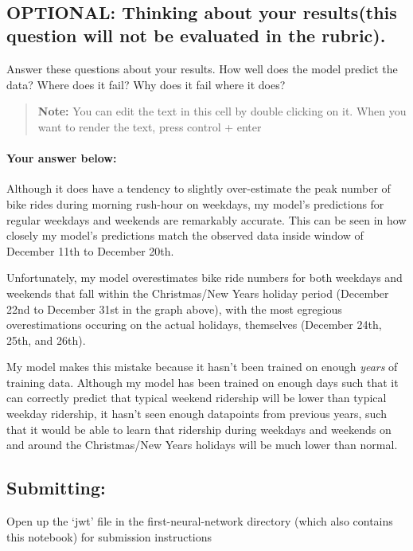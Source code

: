 \documentclass[11pt]{article}
\begin{document}
    \begin{center}
    \end{center}
    { \hspace*{\fill} \\}
    
    \hypertarget{optional-thinking-about-your-resultsthis-question-will-not-be-evaluated-in-the-rubric.}{%
\subsection{OPTIONAL: Thinking about your results(this question will not
be evaluated in the
rubric).}\label{optional-thinking-about-your-resultsthis-question-will-not-be-evaluated-in-the-rubric.}}

Answer these questions about your results. How well does the model
predict the data? Where does it fail? Why does it fail where it does?

\begin{quote}
\textbf{Note:} You can edit the text in this cell by double clicking on
it. When you want to render the text, press control + enter
\end{quote}

\hypertarget{your-answer-below}{%
\paragraph{Your answer below:}\label{your-answer-below}}

Although it does have a tendency to slightly over-estimate the peak
number of bike rides during morning rush-hour on weekdays, my model's
predictions for regular weekdays and weekends are remarkably accurate.
This can be seen in how closely my model's predictions match the
observed data inside window of December 11th to December 20th.

Unfortunately, my model overestimates bike ride numbers for both
weekdays and weekends that fall within the Christmas/New Years holiday
period (December 22nd to December 31st in the graph above), with the
most egregious overestimations occuring on the actual holidays,
themselves (December 24th, 25th, and 26th).

My model makes this mistake because it hasn't been trained on enough
\emph{years} of training data. Although my model has been trained on
enough days such that it can correctly predict that typical weekend
ridership will be lower than typical weekday ridership, it hasn't seen
enough datapoints from previous years, such that it would be able to
learn that ridership during weekdays and weekends on and around the
Christmas/New Years holidays will be much lower than normal.

    \hypertarget{submitting}{%
\subsection{Submitting:}\label{submitting}}

Open up the `jwt' file in the first-neural-network directory (which also
contains this notebook) for submission instructions


    
    
    
    
\end{document}
